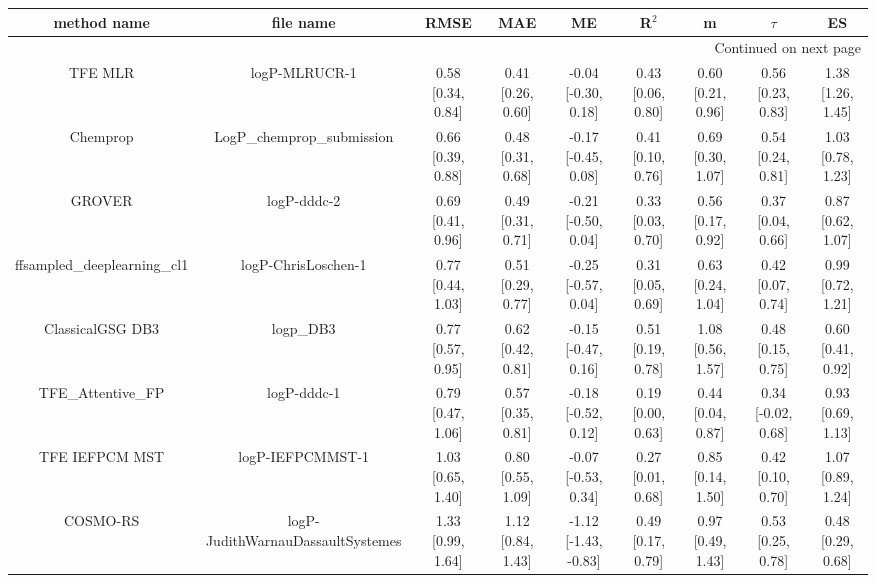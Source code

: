 \documentclass{article}
\begin{document}
\begin{center}
\scriptsize
\begin{longtable}{|ccccccccc|}
\toprule
                method name &                                   file name &               RMSE &                MAE &                    ME &              R$^2$ &                     m &                $\tau$ &                    ES \\
\midrule
\endhead
\midrule
\multicolumn{9}{r}{{Continued on next page}} \\
\midrule
\endfoot

\bottomrule
\endlastfoot
                    TFE MLR &                               logP-MLRUCR-1 &  0.58 [0.34, 0.84] &  0.41 [0.26, 0.60] &   -0.04 [-0.30, 0.18] &  0.43 [0.06, 0.80] &     0.60 [0.21, 0.96] &     0.56 [0.23, 0.83] &     1.38 [1.26, 1.45] \\
                   Chemprop &                  LogP\_chemprop\_submission &  0.66 [0.39, 0.88] &  0.48 [0.31, 0.68] &   -0.17 [-0.45, 0.08] &  0.41 [0.10, 0.76] &     0.69 [0.30, 1.07] &     0.54 [0.24, 0.81] &     1.03 [0.78, 1.23] \\
                     GROVER &                                 logP-dddc-2 &  0.69 [0.41, 0.96] &  0.49 [0.31, 0.71] &   -0.21 [-0.50, 0.04] &  0.33 [0.03, 0.70] &     0.56 [0.17, 0.92] &     0.37 [0.04, 0.66] &     0.87 [0.62, 1.07] \\
 ffsampled_deeplearning_cl1 &                         logP-ChrisLoschen-1 &  0.77 [0.44, 1.03] &  0.51 [0.29, 0.77] &   -0.25 [-0.57, 0.04] &  0.31 [0.05, 0.69] &     0.63 [0.24, 1.04] &     0.42 [0.07, 0.74] &     0.99 [0.72, 1.21] \\
           ClassicalGSG DB3 &                                   logp\_DB3 &  0.77 [0.57, 0.95] &  0.62 [0.42, 0.81] &   -0.15 [-0.47, 0.16] &  0.51 [0.19, 0.78] &     1.08 [0.56, 1.57] &     0.48 [0.15, 0.75] &     0.60 [0.41, 0.92] \\
           TFE_Attentive_FP &                                 logP-dddc-1 &  0.79 [0.47, 1.06] &  0.57 [0.35, 0.81] &   -0.18 [-0.52, 0.12] &  0.19 [0.00, 0.63] &     0.44 [0.04, 0.87] &    0.34 [-0.02, 0.68] &     0.93 [0.69, 1.13] \\
             TFE IEFPCM MST &                            logP-IEFPCMMST-1 &  1.03 [0.65, 1.40] &  0.80 [0.55, 1.09] &   -0.07 [-0.53, 0.34] &  0.27 [0.01, 0.68] &     0.85 [0.14, 1.50] &     0.42 [0.10, 0.70] &     1.07 [0.89, 1.24] \\
                   COSMO-RS &           logP-JudithWarnauDassaultSystemes &  1.33 [0.99, 1.64] &  1.12 [0.84, 1.43] &  -1.12 [-1.43, -0.83] &  0.49 [0.17, 0.79] &     0.97 [0.49, 1.43] &     0.53 [0.25, 0.78] &     0.48 [0.29, 0.68] \\

\end{longtable}
\end{center}
\end{document}
